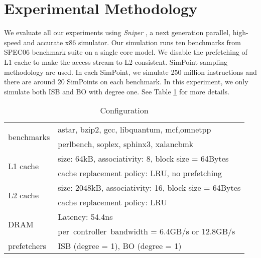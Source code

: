 \section{Experimental Methodology}
\label{sec:methodology}

We evaluate all our experiments using \emph{Sniper} \cite{sniperpaper}, a next generation parallel, high-speed and accurate x86 simulator. Our simulation runs ten benchmarks from SPEC06 benchmark suite on a single core model. We disable the prefetching of L1 cache to make the access stream to L2 consistent. SimPoint sampling methodology are used. In each SimPoint, we simulate 250 million instructions and there are around 20 SimPoints on each benchmark. In this experiment, we only simulate both ISB and BO with degree one. See Table \ref{table:config} for more details. 
\begin{table}[ht!]
\centering
        \renewcommand{\multirowsetup}{\centering}
        \begin{tabular}{|l|l|}
        \hline
        \multirow{2}{3cm}{benchmarks}   & {astar, bzip2, gcc, libquantum, mcf,omnetpp} \\
         \multirow{2}{3cm}{}  & {perlbench, soplex, sphinx3, xalancbmk} \\ \cline{1-2}
         \multirow{2}{3cm}{L1 cache}  & {size: 64kB, associativity: 8, block size = 64Bytes} \\
         \multirow{2}{3cm}{}  & {cache replacement policy: LRU, no prefetching} \\ \cline{1-2}
         \multirow{2}{3cm}{L2 cache}  & {size: 2048kB, associativity: 16, block size = 64Bytes} \\
         \multirow{2}{3cm}{}  & {cache replacement policy: LRU} \\ \cline{1-2}
         \multirow{2}{3cm}{DRAM }
         	& {Latency: 54.4ns } \\
	 \multirow{1}{3cm}{}  & {per\ controller\ bandwidth = 6.4GB/s or 12.8GB/s} \\ \cline{1-2}
         \multirow{1}{3cm}{prefetchers}  & {ISB (degree = 1), BO (degree = 1)} \\ \cline{1-2}
        \hline
        \end{tabular}
\caption{Configuration}
\label{table:config}
\end{table}
